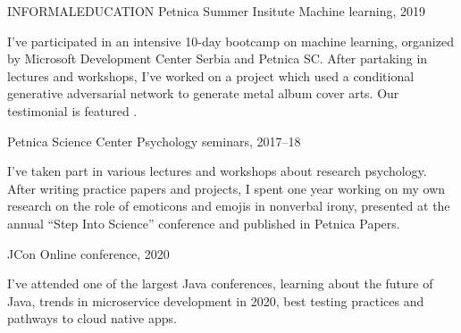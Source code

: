 \begin{minipage}[t]{\linewidth}\vspace{\sectionTopmargin}
{\alignRight\titleFont\light INFORMAL\linebreak\alignRight EDUCATION}\linebreak\newline
{\alignRight\rSubtitleFont\bold Petnica Summer Insitute}\newline
{\alignRight\rSubSubtitleFont\light Machine learning, 2019}\linebreak\newline

\vspace{\rContentTopMargin}
{\contentFont I've participated in an intensive 10-day bootcamp on machine learning, organized by Microsoft Development Center Serbia and Petnica SC. After partaking in lectures and workshops, I've worked on a project which used a conditional generative adversarial network to generate metal album cover arts. Our testimonial is featured .}

\end{minipage}\newline%
%
\begin{minipage}[t]{\linewidth}\vspace{\subsectionSpace}
{\alignRight\rSubtitleFont\bold Petnica Science Center}\newline
{\alignRight\rSubSubtitleFont\light Psychology seminars, 2017–18}\linebreak\newline

\vspace{\rContentTopMargin}
{\contentFont I've taken part in various lectures and workshops about research psychology. After writing practice papers and projects, I spent one year working on my own research on the role of emoticons and emojis in nonverbal irony, presented at the annual “Step Into Science” conference and published in Petnica Papers.}
\end{minipage}\newline%
%
\begin{minipage}[t]{\linewidth}\vspace{\subsectionSpace}
{\alignRight\rSubtitleFont\bold JCon}\newline
{\alignRight\rSubSubtitleFont\light Online conference, 2020}\linebreak\newline

\vspace{\rContentTopMargin}
{\contentFont I've attended one of the largest Java conferences, learning about the future of Java, trends in microservice development in 2020, best testing practices and pathways to cloud native apps. } %
\end{minipage}\newline%